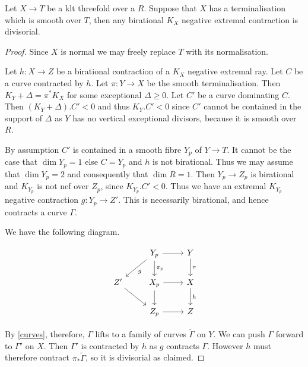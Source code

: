 	\begin{lemma}\label{lifting}
		
		Let $X \to T$ be a klt threefold over a $R$. Suppose that $X$ has a terminalisation which is smooth over $T$, then any birational $K_{X}$ negative extremal contraction is divisorial.
		
	\end{lemma}
	
	\begin{proof}
		
		Since $X$ is normal we may freely replace $T$ with its normalisation.
		
		Let $h:X \to Z$ be a birational contraction of a $K_{X}$ negative extremal ray. Let $C$ be a curve contracted by $h$. Let $\pi:Y \to X$ be the smooth terminalisation. Then $K_{Y}+\Delta=\pi^{*}K_{X}$ for some exceptional $\Delta \geq 0$. Let $C'$ be a curve dominating $C$. Then $(K_{Y}+\Delta).C' <0$ and thus $K_{Y}.C' < 0$ since $C'$ cannot be contained in the support of $\Delta$ as $Y$ has no vertical exceptional divisors, because it is smooth over $R$.
		
		By assumption $C'$ is contained in a smooth fibre $Y_{p}$ of $Y \to T$. It cannot be the case that $\dim Y_{p}=1$ else $C=Y_{p}$ and $h$ is not birational. Thus we may assume that $\dim Y_{p}=2$ and consequently that $\dim R=1$. Then $Y_{p} \to Z_{p}$ is birational and $K_{Y_{p}}$ is not nef over $Z_{p}$, since $K_{Y_{p}}.C' < 0$. Thus we have an extremal $K_{Y_{p}}$ negative contraction $g:Y_{p} \to Z'$. This is necessarily birational, and hence contracts a curve $\Gamma$.
		
		We have the following diagram.
		
		\[\begin{tikzcd}
		& Y_{p} \arrow[ld, "g"] \arrow[r]  \arrow[d, "\pi_{p}"]& Y \arrow[d, "\pi"] \\
		Z' \arrow[rd]         & X_{p} \arrow[r] \arrow[d]         & X \arrow[d, "h"]   \\
		& Z_{p} \arrow[r]                & Z                 
		\end{tikzcd}\]
		
		
		By \autoref{curves}, therefore, $\Gamma$ lifts to a family of curves $\tilde{\Gamma}$ on $Y$. We can push $\Gamma$ forward to $\Gamma'$ on $X$. Then $\Gamma'$ is contracted by $h$ as $g$ contracts $\Gamma$. However $h$ must therefore contract $\pi_{*}\tilde{\Gamma}$, so it is divisorial as claimed. 		
	\end{proof}

